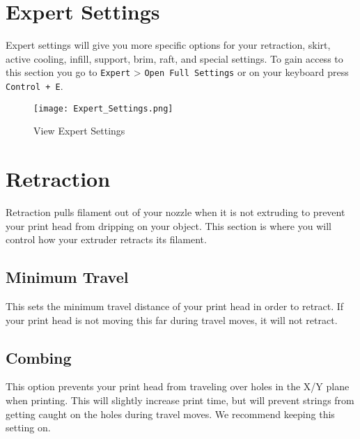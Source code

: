 
\section{Expert Settings}
Expert settings will give you more specific options for your retraction, skirt, active cooling, infill, support, brim, raft, and special settings. To gain access to this section you go to \texttt{Expert} > \texttt{Open Full Settings} or on your keyboard press \texttt{Control + E}.
\begin{figure}[H]
\centering
\texttt{[image: Expert\_Settings.png]}
\caption{View Expert Settings}
\label{fig:Expert Settings}
\end{figure}

\section{Retraction}
Retraction pulls filament out of your nozzle when it is not extruding to prevent your print head from dripping on your object. This section is where you will control how your extruder retracts its filament.

\subsection{Minimum Travel}
This sets the minimum travel distance of your print head in order to retract. If your print head is not moving this far during travel moves, it will not retract.

\subsection{Combing}
This option prevents your print head from traveling over holes in the X/Y plane when printing. This will slightly increase print time, but will prevent strings from getting caught on the holes during travel moves. We recommend keeping this setting on.

